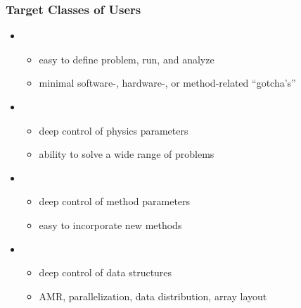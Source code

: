     \begin{frame}[fragile] \frametitle{Target Classes of Users}
      \begin{itemize}
        \item {}
        \begin{itemize}
          \item {}easy to define problem, run, and analyze
          \item {}minimal software-, hardware-, or method-related ``gotcha's''
        \end{itemize}
        \item {}
        \begin{itemize}
          \item {}deep control of physics parameters
          \item {}ability to solve a wide range of problems
        \end{itemize}
        \item {}
        \begin{itemize}
          \item {}deep control of method parameters
          \item {}easy to incorporate new methods
        \end{itemize}
        \item {}
        \begin{itemize}
          \item {}deep control of data structures
          \item {}AMR, parallelization, data distribution, array layout
        \end{itemize}
      \end{itemize}
\end{frame}
